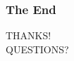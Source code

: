 \documentclass{beamer}
\begin{document}
\begin{frame}
\frametitle{The End}
\begin{centering}
THANKS!\\
QUESTIONS?\\
\end{centering}
\end{frame}
\end{document}

